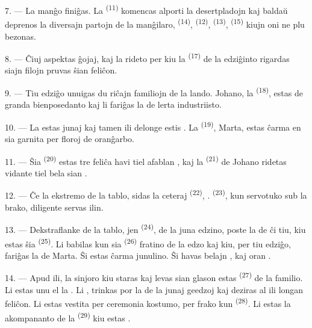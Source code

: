 7. --- La manĝo finiĝas. La  \textsuperscript{(11)} komencas
alporti la desertpladojn kaj baldaŭ deprenos la diversajn partojn de la
manĝilaro,  \textsuperscript{(14)}, 
\textsuperscript{(12)},  \textsuperscript{(13)},
 \textsuperscript{(15)} kiujn oni ne plu bezonas.

\VUsaut{3.0mm}

8. --- Ĉiuj aspektas ĝojaj, kaj la rideto per kiu la 
\textsuperscript{(17)} de la edziĝinto rigardas siajn filojn pruvas ŝian
feliĉon.

9. --- Tiu edziĝo unuigas du riĉajn familiojn de la lando. Johano, la
 \textsuperscript{(18)}, estas  de granda
bienposedanto kaj li fariĝas la  de lerta industriisto.

10. --- La  estas junaj kaj tamen ili delonge estis
. La  \textsuperscript{(19)}, Marta,
estas ĉarma en sia  garnita per floroj de oranĝarbo.

11. --- Ŝia  \textsuperscript{(20)} estas tre feliĉa havi tiel
afablan , kaj la  \textsuperscript{(21)} de
Johano ridetas vidante tiel bela sian .

12. --- Ĉe la ekstremo de la tablo, sidas la ceteraj 
\textsuperscript{(22)}, .
 \textsuperscript{(23)}, kun servotuko sub la brako,
diligente servas ilin.

\VUsaut{3.0mm}

13. --- Dekstraflanke de la tablo, jen  \textsuperscript{(24)},
 de la juna edzino, poste la  de ĉi tiu, kiu
estas ŝia  \textsuperscript{(25)}. Li babilas kun sia
 \textsuperscript{(26)} fratino de la edzo kaj kiu, per
tiu edziĝo, fariĝas la  de Marta. Ŝi estas ĉarma junulino.
Ŝi havas belajn , kaj oran .

14. --- Apud ili, la sinjoro kiu staras kaj levas sian glason estas
 \textsuperscript{(27)} de la familio. Li estas unu el la
. Li , trinkas por la
 de la junaj geedzoj kaj deziras al ili longan feliĉon. Li estas
vestita per ceremonia kostumo, per frako kun 
\textsuperscript{(28)}. Li estas la akompananto de la 
\textsuperscript{(29)} kiu estas .

